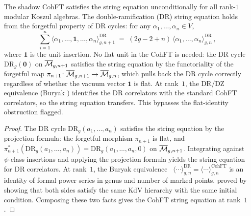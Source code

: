 \begin{proposition}
\label{prop:cohft-string-dr}
\ClaimStatusProvedHere
The shadow CohFT satisfies the string equation unconditionally
for all rank-$1$ modular Koszul algebras. The double-ramification
(DR) string equation holds from the forgetful property of DR
cycles: for any $\alpha_1, \ldots, \alpha_n \in V$,
\[
 \sum_{i=1}^{n}
 \bigl\langle \alpha_1, \ldots, \mathbf{1}, \ldots, \alpha_n
 \bigr\rangle_{g,n+1}^{\mathrm{DR}}
 \;=\;
 (2g - 2 + n)\,
 \bigl\langle \alpha_1, \ldots, \alpha_n
 \bigr\rangle_{g,n}^{\mathrm{DR}}\,,
\]
where $\mathbf{1}$ is the unit insertion. No flat unit in the
CohFT is needed: the DR cycle $\mathrm{DR}_g(\mathbf{0})$ on
$\overline{\mathcal M}_{g,n+1}$ satisfies the string equation by
the functoriality of the forgetful map
$\pi_{n+1}\colon \overline{\mathcal M}_{g,n+1} \to \overline{\mathcal M}_{g,n}$,
which pulls back the DR cycle correctly regardless of whether
the vacuum vector $\mathbf{1}$ is flat.
At rank~$1$, the DR/DZ equivalence
\textup{(}Buryak \cite{Bur15}\textup{)} identifies the DR
correlators with the standard CohFT correlators, so the string
equation transfers. This bypasses the flat-identity
obstruction flagged.
\end{proposition}

\begin{proof}
The DR cycle $\mathrm{DR}_g(a_1, \ldots, a_n)$ satisfies the
string equation by the projection formula: the forgetful
morphism $\pi_{n+1}$ is flat, and
$\pi_{n+1}^*(\mathrm{DR}_g(a_1, \ldots, a_n))
= \mathrm{DR}_g(a_1, \ldots, a_n, 0)$ on
$\overline{\mathcal M}_{g,n+1}$. Integrating against
$\psi$-class insertions and applying the projection formula
yields the string equation for DR correlators. At rank~$1$,
the Buryak equivalence~\cite{Bur15}
$\langle \cdots \rangle^{\mathrm{DR}}_{g,n}
= \langle \cdots \rangle^{\mathrm{CohFT}}_{g,n}$
is an identity of formal power series in genus and number of
marked points, proved by showing that both sides satisfy the
same KdV hierarchy with the same initial condition. Composing
these two facts gives the CohFT string equation at rank~$1$.
\end{proof}

